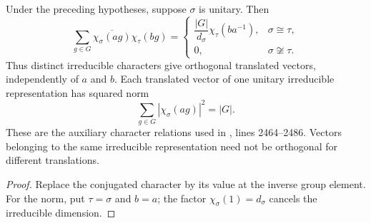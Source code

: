 \begin{lemma}
    \label{thm:peps_translated_character_inner_product}
    \leanok
    Under the preceding hypotheses, suppose $\sigma$ is unitary. Then
    \[
        \sum_{g\in G}\overline{\chi_\sigma(ag)}\chi_\tau(bg)
        =\begin{cases}
            \dfrac{|G|}{d_\sigma}\chi_\tau(ba^{-1}), & \sigma\cong\tau,     \\
            0,                                       & \sigma\not\cong\tau.
        \end{cases}
    \]
    Thus distinct irreducible characters give orthogonal translated vectors,
    independently of $a$ and $b$. Each translated vector of one unitary
    irreducible representation has squared norm
    \[
        \sum_{g\in G}|\chi_\sigma(ag)|^2=|G|.
    \]
    These are the auxiliary character relations used in
    \cite[charge-detection proof]{Schuch2010PEPS}, lines 2464--2486.
    Vectors belonging to the same irreducible representation need not be
    orthogonal for different translations.
\end{lemma}
\begin{proof}\leanok
    Replace the conjugated character by its value at the inverse group
    element. For the norm, put $\tau=\sigma$ and $b=a$; the factor
    $\chi_\sigma(1)=d_\sigma$ cancels the irreducible dimension.
\end{proof}
